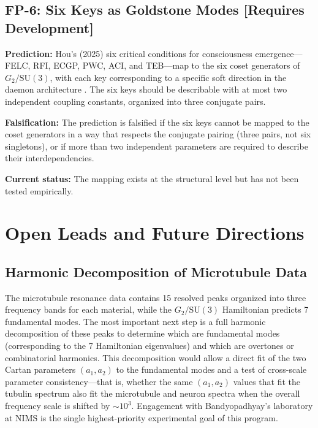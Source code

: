 \documentclass[12pt,a4paper]{article}
\begin{document}
\subsection{FP-6: Six Keys as Goldstone Modes [Requires Development]}

\textbf{Prediction:} Hou's (2025) six critical conditions for consciousness emergence---FELC, RFI, ECGP, PWC, ACI, and TEB---map to the six coset generators of $G_2/\mathrm{SU}(3)$, with each key corresponding to a specific soft direction in the daemon architecture \citep{Hou2025}. The six keys should be describable with at most two independent coupling constants, organized into three conjugate pairs.

\textbf{Falsification:} The prediction is falsified if the six keys cannot be mapped to the coset generators in a way that respects the conjugate pairing (three pairs, not six singletons), or if more than two independent parameters are required to describe their interdependencies.

\textbf{Current status:} The mapping exists at the structural level but has not been tested empirically.

\section{Open Leads and Future Directions}

\subsection{Harmonic Decomposition of Microtubule Data}

The microtubule resonance data \citep{Sahu2013,Singh2014,Saxena2020} contains 15 resolved peaks organized into three frequency bands for each material, while the $G_2/\mathrm{SU}(3)$ Hamiltonian predicts 7 fundamental modes. The most important next step is a full harmonic decomposition of these peaks to determine which are fundamental modes (corresponding to the 7 Hamiltonian eigenvalues) and which are overtones or combinatorial harmonics. This decomposition would allow a direct fit of the two Cartan parameters $(a_1, a_2)$ to the fundamental modes and a test of cross-scale parameter consistency---that is, whether the same $(a_1, a_2)$ values that fit the tubulin spectrum also fit the microtubule and neuron spectra when the overall frequency scale is shifted by ${\sim}10^3$. Engagement with Bandyopadhyay's laboratory at NIMS is the single highest-priority experimental goal of this program.
\end{document}
